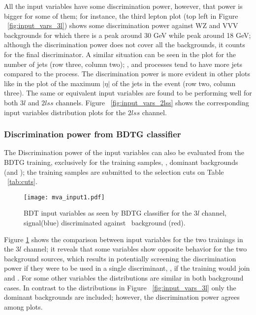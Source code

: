 All the input variables have some discrimination power, however, that power is bigger for some of them; for instance, the third lepton \pt plot (top left in Figure ~\ref{fig:input_vars_3l}) shows some discrimination power against WZ and VVV backgrounds for which there is a peak around 30 GeV while \tHq peak around 18 GeV; although the discrimination power does not cover all the backgrounds, it counts for the final discriminator. A similar situation can be seen in the plot for the number of jets (row three, column two); \ttW, \ttZ and \ttH processes tend to have more jets compared to the \tHq process. The discrimination power is more evident in other plots like in the plot of the maximum $|\eta|$ of the jets in the event (row two, column three). The same or equivalent input variables are found to be performing well for both $3l$ and $2lss$ channels. Figure ~\ref{fig:input_vars_2lss} shows the corresponding input variables distribution plots for the $2lss$ channel.

\subsubsection*{Discrimination power from BDTG classifier}


The Discrimination power of the input variables can also be evaluated from the BDTG training, exclusively for the training samples, \ie, dominant backgrounds (\ttbar and \ttV); the training samples are submitted to the selection cuts on Table ~\ref{tab:cuts}.

\begin{figure} [!ht]
  \centering
  \texttt{[image: mva\_input1.pdf]}
  \caption[BDT input variables. Discrimination against \ttbar and \ttV\ in $3l$ channel.]{BDT input variables as seen by BDTG classifier for the $3l$ channel, \tHq signal(blue) discriminated against \ttV\ background (red).}
\label{fig:mva_input_comp}
\end{figure}

Figure \ref{fig:mva_input_comp} shows the comparison between input variables for the two trainings in the $3l$ channel; it reveals that some variables show opposite behavior for the two background sources, which results in potentially screening the discrimination power if they were to be used in a single discriminant, \ie, if the training would join \ttbar and \ttV. For some other variables the distributions are similar in both background cases. In contrast to the distributions in Figure ~\ref{fig:input_vars_3l} only the dominant backgrounds are included; however, the discrimination power agrees among plots.

